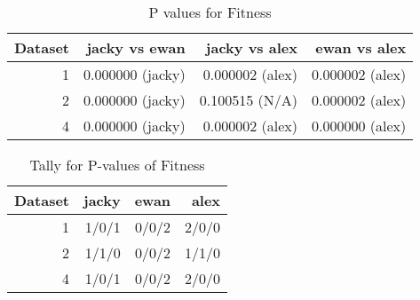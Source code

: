 \documentclass{article}
\begin{document}
\begin{table}
\centering
\begin{tabular}{rrrr}
  \hline
Dataset & jacky vs ewan & jacky vs alex & ewan vs alex \\ 
  \hline
1 & 0.000000 (jacky) & 0.000002 (alex) & 0.000002 (alex) \\ 
  2 & 0.000000 (jacky) & 0.100515 (N/A) & 0.000002 (alex) \\ 
  4 & 0.000000 (jacky) & 0.000002 (alex) & 0.000000 (alex) \\ 
   \hline
\end{tabular}
\caption{P values for Fitness} 
\end{table}
\begin{table}
\centering
\begin{tabular}{rrrr}
  \hline
Dataset & jacky & ewan & alex \\ 
  \hline
1 & 1/0/1 & 0/0/2 & 2/0/0 \\ 
  2 & 1/1/0 & 0/0/2 & 1/1/0 \\ 
  4 & 1/0/1 & 0/0/2 & 2/0/0 \\ 
   \hline
\end{tabular}
\caption{Tally for P-values of Fitness} 
\end{table}
\end{document}
